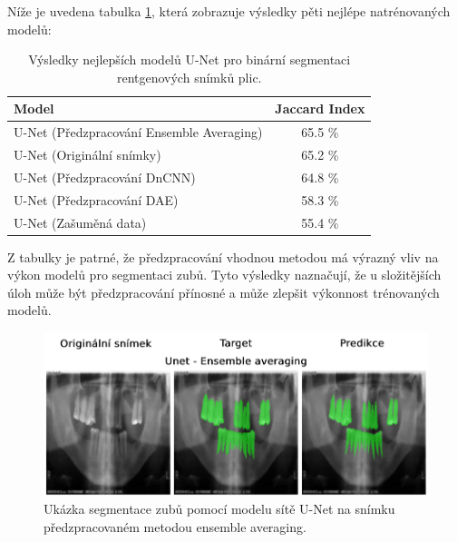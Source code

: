 \documentclass[male,czech,api_ing]{thesis}
\begin{document}
Níže je uvedena tabulka \ref{tab:MulticlassUnetResults}, která zobrazuje výsledky pěti nejlépe natrénovaných modelů:

\begin{table}[ht]
    \centering
    \begin{tabular}{|l|c|}
        \hline
        \textbf{Model}                            & \textbf{Jaccard Index} \\ \hline
        U-Net (Předzpracování Ensemble Averaging) & 65.5 \%                 \\ \hline
        U-Net (Originální snímky)                 & 65.2 \%                 \\ \hline
        U-Net (Předzpracování DnCNN)              & 64.8 \%                 \\ \hline
        U-Net (Předzpracování DAE)                & 58.3 \%                 \\ \hline
        U-Net (Zašuměná data)                     & 55.4 \%                 \\ \hline
    \end{tabular}
    \caption{Výsledky nejlepších modelů U-Net pro binární segmentaci rentgenových snímků plic.}
    \label{tab:MulticlassUnetResults}
\end{table}

Z tabulky je patrné, že předzpracování vhodnou metodou má výrazný vliv na výkon modelů pro segmentaci zubů. Tyto výsledky naznačují, že u složitějších úloh může být předzpracování přínosné a může zlepšit výkonnost trénovaných modelů.

\begin{figure}[h]
    \centering
    \includegraphics[width=\linewidth]{Prilohy/Obrazky/MulticlassUnetEnsemble.png}
    \caption{Ukázka segmentace zubů pomocí modelu sítě U-Net na snímku předzpracovaném metodou ensemble averaging.}
    \label{fig:MulticlassUnet}
\end{figure}
\end{document}
